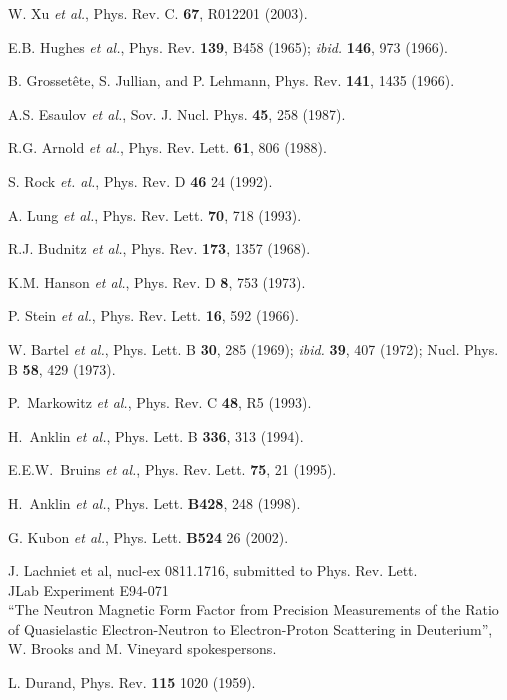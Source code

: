 \documentclass[12pt,letterpaper,oneside]{article}
\begin{document}
\begin{thebibliography}{}
W. Xu {\it et al.}, Phys. Rev. C. {\bf 67}, R012201 (2003). 


E.B. Hughes {\it et al.}, Phys. Rev. {\bf 139},  B458 (1965); {\it ibid.} 
{\bf 146}, 973 (1966).

B. Grosset\^{e}te, S. Jullian, and P. Lehmann, Phys. Rev. {\bf 141}, 
1435 (1966). 

A.S. Esaulov {\it et al.}, Sov. J. Nucl. Phys. {\bf 45}, 258 (1987).

R.G. Arnold {\it et al.}, Phys. Rev. Lett. {\bf 61}, 806 (1988).

S. Rock {\it et. al.}, Phys. Rev. D {\bf 46} 24 (1992).

A. Lung {\it et al.}, Phys. Rev. Lett. {\bf 70}, 718 (1993).



R.J. Budnitz {\it et al.}, Phys. Rev. {\bf 173}, 1357 (1968).

K.M. Hanson {\it et al.}, Phys. Rev. D {\bf 8}, 753 (1973).



P. Stein {\it et al.}, Phys. Rev. Lett. {\bf 16}, 592 (1966).

W. Bartel {\it et al.}, Phys. Lett. B {\bf 30}, 285 (1969); {\it ibid.} 
{\bf 39}, 407 (1972); Nucl. Phys. B {\bf 58}, 429 (1973).

 P.~Markowitz {\it et al.}, Phys. Rev. C {\bf 48}, R5 (1993).

H.~Anklin {\it et al.}, Phys. Lett. B {\bf 336}, 313 (1994).

E.E.W.~Bruins {\it et al.}, Phys. Rev. Lett. {\bf 75}, 21 
(1995).

 H.~Anklin {\it et al.}, Phys. Lett. {\bf B428}, 248 (1998).

G. Kubon {\it et al.}, Phys. Lett. {\bf B524} 26 (2002).

J. Lachniet et al, nucl-ex 0811.1716, submitted to Phys. Rev. Lett.\\
JLab Experiment E94-071\\
``The Neutron Magnetic Form Factor from Precision Measurements
of the Ratio of Quasielastic Electron-Neutron to
Electron-Proton Scattering in Deuterium'', W. Brooks and M. Vineyard
{spokespersons}.

L. Durand, Phys. Rev. {\bf 115}  1020 (1959).


\end{thebibliography}
\end{document}
